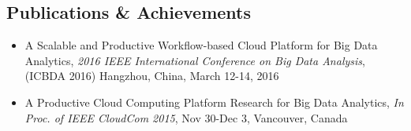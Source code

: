 \begin{singlespace}
\section*{\large \bf Publications \& Achievements}


\begin{itemize}

\item A Scalable and Productive Workflow-based Cloud Platform for Big Data Analytics, {\it 2016 IEEE International Conference on Big Data Analysis}, (ICBDA 2016) Hangzhou, China, March 12-14, 2016

\item A Productive Cloud Computing Platform Research for Big Data Analytics, {\it In Proc. of IEEE CloudCom 2015}, Nov 30-Dec 3, Vancouver, Canada

\end{itemize}

\end{singlespace}




